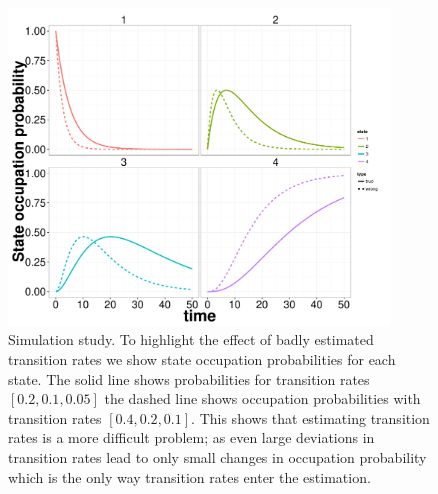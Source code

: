 \begin{figure}
  \centering
  \includegraphics[width=0.9\textwidth]{pics/wrong_w.pdf}
  \caption{Simulation study. To highlight the effect of badly estimated transition rates we show state occupation probabilities for each state. The solid line shows probabilities for transition rates $[0.2, 0.1, 0.05]$ the dashed line shows occupation probabilities with transition rates $[0.4, 0.2, 0.1]$. This shows  that estimating transition rates is a more difficult problem; as even large deviations in transition rates lead to only small changes in occupation probability which is the only way transition rates enter the estimation. }
  \label{fig:wrong_w}
\end{figure}




